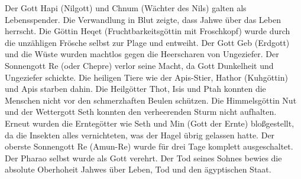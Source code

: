 \label{sec:org93b203d}
Der Gott Hapi (Nilgott) und Chnum (Wächter des Nils) galten als Lebensspender. Die Verwandlung in Blut zeigte, dass Jahwe über das Leben herrscht.
\label{sec:org7ee5c7e}
Die Göttin Heqet (Fruchtbarkeitsgöttin mit Froschkopf) wurde durch die unzähligen Frösche selbst zur Plage und entweiht.
\label{sec:org8d01b30}
Der Gott Geb (Erdgott) und die Wüste wurden machtlos gegen die Heerscharen von Ungeziefer.
\label{sec:org6915060}
Der Sonnengott Re (oder Chepre) verlor seine Macht, da Gott Dunkelheit und Ungeziefer schickte.
\label{sec:orgd58524f}
Die heiligen Tiere wie der Apis-Stier, Hathor (Kuhgöttin) und Apis starben dahin.
\label{sec:org86b7009}
Die Heilgötter Thot, Isis und Ptah konnten die Menschen nicht vor den schmerzhaften Beulen schützen.
\label{sec:orgf2c6169}
Die Himmelsgöttin Nut und der Wettergott Seth konnten den verheerenden Sturm nicht aufhalten.
\label{sec:org5dc4c7e}
Erneut wurden die Erntegötter wie Seth und Min (Gott der Ernte) bloßgestellt, da die Insekten alles vernichteten, was der Hagel übrig gelassen hatte.
\label{sec:org51aa9d9}
Der oberste Sonnengott Re (Amun-Re) wurde für drei Tage komplett ausgeschaltet.
\label{sec:org866264d}
Der Pharao selbst wurde als Gott verehrt. Der Tod seines Sohnes bewies die absolute Oberhoheit Jahwes über Leben, Tod und den ägyptischen Staat.

